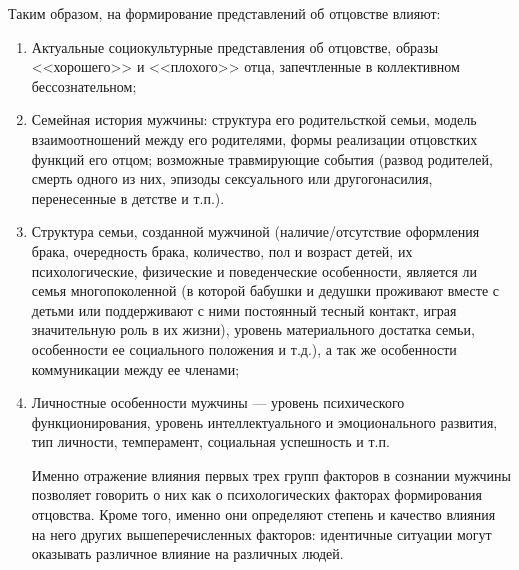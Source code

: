 \documentclass{../../common/thesisbyxetex}
\begin{document}
Таким образом, на формирование представлений об отцовстве влияют:

\begin{enumerate}
	\item Актуальные социокультурные представления об отцовстве, образы <<хорошего>> и <<плохого>>
отца, запечтленные в коллективном бессознательном;

    \item Семейная история мужчины: структура его родительсткой семьи,  модель взаимоотношений
между его родителями, формы реализации отцовстких функций его отцом; возможные травмирующие события
(развод родителей, смерть одного из них, эпизоды сексуального или другогонасилия, перенесенные в
детстве и т.п.).

	\item Структура семьи, созданной мужчиной (наличие/отсутствие оформления брака,
очередность брака, количество, пол и возраст детей, их психологические, физические и
поведенческие особенности, является ли семья многопоколенной (в которой бабушки и дедушки
проживают вместе с детьми или поддерживают с ними постоянный тесный контакт, играя
значительную роль в их жизни), уровень материального достатка семьи, особенности ее социального
положения и т.д.), а так же  особенности коммуникации между ее членами;

	\item Личностные особенности мужчины --- уровень психического функционирования,
уровень интеллектуального и эмоционального развития, тип личности, темперамент, социальная
успешность и т.п.

Именно отражение влияния первых трех групп факторов в сознании мужчины позволяет говорить о них как
о психологических факторах формирования отцовства. Кроме того, именно они определяют степень и
качество влияния на него других вышеперечисленных факторов: идентичные ситуации могут оказывать
различное влияние на различных людей.
\end{enumerate}
\end{document}
